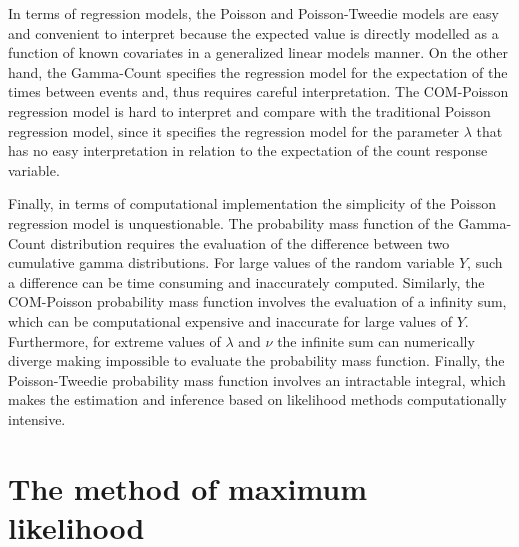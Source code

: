\documentclass[9pt,a5paper,]{book}
\theoremstyle{definition}
\theoremstyle{definition}
\theoremstyle{remark}
\begin{document}
In terms of regression models, the Poisson and Poisson-Tweedie models
are easy and convenient to interpret because the expected value is
directly modelled as a function of known covariates in a generalized
linear models manner. On the other hand, the Gamma-Count specifies the
regression model for the expectation of the times between events and,
thus requires careful interpretation. The COM-Poisson regression model
is hard to interpret and compare with the traditional Poisson regression
model, since it specifies the regression model for the parameter
\(\lambda\) that has no easy interpretation in relation to the
expectation of the count response variable.

Finally, in terms of computational implementation the simplicity of the
Poisson regression model is unquestionable. The probability mass
function of the Gamma-Count distribution requires the evaluation of the
difference between two cumulative gamma distributions. For large values
of the random variable \(Y\), such a difference can be time consuming
and inaccurately computed. Similarly, the COM-Poisson probability mass
function involves the evaluation of a infinity sum, which can be
computational expensive and inaccurate for large values of \(Y\).
Furthermore, for extreme values of \(\lambda\) and \(\nu\) the infinite
sum can numerically diverge making impossible to evaluate the
probability mass function. Finally, the Poisson-Tweedie probability mass
function involves an intractable integral, which makes the estimation
and inference based on likelihood methods computationally intensive.

\chapter{The method of maximum likelihood}\label{likelihood}
\end{document}
